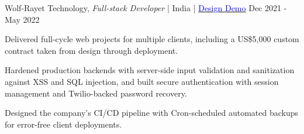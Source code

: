 \begin{cventries}
  \cventrynew
    {Wolf-Rayet Technology, \textnormal{\textit{Full-stack Developer} | India | \href{https://wolfrayet-tech.github.io/testsuite5/}{\textcolor{blue}{Design Demo}}}} %
    {Dec 2021 - May 2022} %
    {
  \begin{cvitems}
    \item {Delivered full-cycle web projects for multiple clients, including a US\$5,000 custom contract taken from design through deployment.}
    \item {Hardened production backends with server-side input validation and sanitization against XSS and SQL injection, and built secure authentication with session management and Twilio-backed password recovery.}
    \item {Designed the company's CI/CD pipeline with Cron-scheduled automated backups for error-free client deployments.}
 \end{cvitems}
}


\end{cventries}
